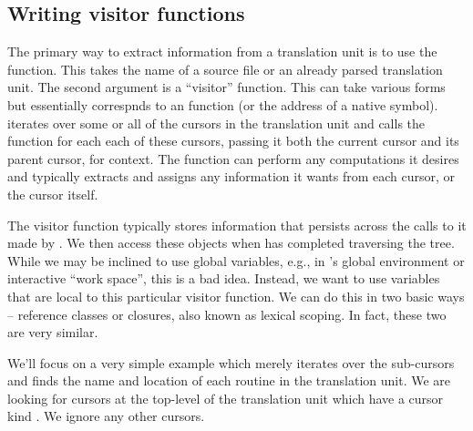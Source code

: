 \subsection{Writing visitor functions}


The primary way to extract information from a translation unit is to
use the  function.  This takes the name of a source
file or an already parsed translation unit.  The second argument is a
``visitor'' function.  This can take various forms but
essentially correspnds to an \R{} function (or the address of a native
symbol).  \libclang{} iterates over some or all of the cursors in the
translation unit and calls the \R{} function for each each of these
cursors, passing it both the current cursor and its parent cursor, for
context.  The function can perform any computations it desires and
typically extracts and assigns any information it wants from each cursor, or the
cursor itself.


The visitor function typically stores information that persists across
the calls to it made by \libclang.  We then access these objects when
\libclang{} has completed traversing the tree.  While we may be
inclined to use global variables, e.g., in \R{}'s global environment or
interactive ``work space'', this is a bad idea.  Instead, we want to
use variables that are local to this particular visitor function.  We
can do this in two basic ways -- reference classes or closures, also
known as lexical scoping.  In fact, these two are very similar.

We'll focus on a very simple example which merely
iterates over the sub-cursors and finds the name and location of each
routine in the translation unit.  We are looking for cursors at the
top-level of the translation unit which have a cursor kind
.  We ignore any other cursors.

